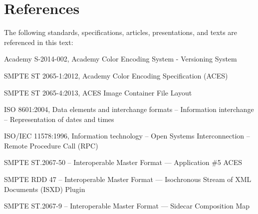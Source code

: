 \numberedformat
\chapter{References}
The following standards, specifications, articles, presentations, and texts are referenced in this text:

Academy S-2014-002, Academy Color Encoding System - Versioning System 

SMPTE ST 2065-1:2012, Academy Color Encoding Specification (ACES)

SMPTE ST 2065-4:2013, ACES Image Container File Layout

ISO 8601:2004, Data elements and interchange formats -- Information interchange -- Representation of dates and times

ISO/IEC 11578:1996, Information technology -- Open Systems Interconnection -- Remote Procedure Call (RPC)

SMPTE ST.2067-50 -- Interoperable Master Format --- Application \#5 ACES

SMPTE RDD 47 -- Interoperable Master Format --- Isochronous Stream of XML Documents (ISXD) Plugin
 
SMPTE ST.2067-9 -- Interoperable Master Format --- Sidecar Composition Map
